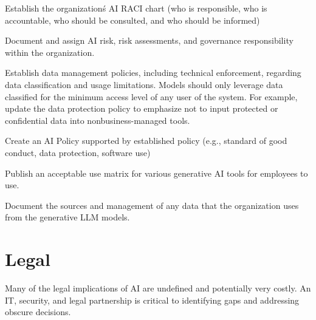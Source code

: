 \begin{minipage}{\linewidth}
\begin{checklist}
  \item Establish the organization\'s AI RACI chart (who is responsible, who is accountable, who should be consulted, and who should be informed)
  \item Document and assign AI risk, risk assessments, and governance responsibility within the organization.
  \item Establish data management policies, including technical enforcement, regarding data classification and usage limitations. Models should only leverage data classified for the minimum access level of any user of the system. For example, update the data protection policy to emphasize not to input protected or confidential data into nonbusiness-managed tools.
  \item Create an AI Policy supported by established policy (e.g., standard of good conduct, data protection, software use)
  \item Publish an acceptable use matrix for various generative AI tools for employees to use.
  \item Document the sources and management of any data that the organization uses from the generative LLM models.
\end{checklist}
\end{minipage}

\section{Legal}
Many of the legal implications of AI are undefined and potentially very costly.
An IT, security, and legal partnership is critical to identifying gaps and
addressing obscure decisions.

